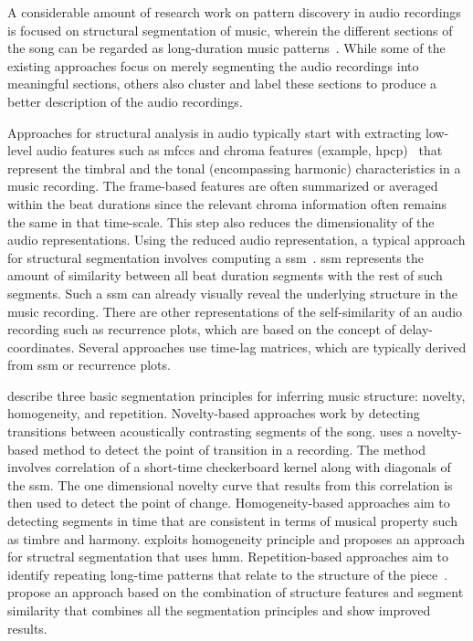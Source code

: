 A considerable amount of research work on pattern discovery in audio recordings is focused on structural segmentation of music, wherein the different sections of the song can be regarded as long-duration music patterns~\citep{paulus2010state}. While some of the existing approaches focus on merely segmenting the audio recordings into meaningful sections, others also cluster and label these sections to produce a better description of the audio recordings. 

Approaches for structural analysis in audio typically start with extracting low-level audio features such as \gls{mfccs} and chroma features (example, \gls{hpcp})~\citep{gomez2006tonal} that represent the timbral and the tonal (encompassing harmonic) characteristics in a music recording. The frame-based features are often summarized or averaged within the beat durations since the relevant chroma information often remains the same in that time-scale. This step also reduces the dimensionality of the audio representations. Using the reduced audio representation, a typical approach for structural segmentation involves computing a \gls{ssm}~\citep{foote2000automatic}. \Gls{ssm} represents the amount of similarity between all beat duration segments with the rest of such segments. Such a \gls{ssm} can already visually reveal the underlying structure in the music recording. There are other representations of the self-similarity of an audio recording such as recurrence plots, which are based on the concept of delay-coordinates. Several approaches use time-lag matrices, which are typically derived from \gls{ssm} or recurrence plots.

\cite{paulus2010state} describe three basic segmentation principles for inferring music structure: novelty, homogeneity, and repetition. Novelty-based approaches work by detecting transitions between acoustically contrasting segments of the song. \cite{foote2000automatic} uses a novelty-based method to detect the point of transition in a recording. The method involves correlation of a short-time checkerboard kernel along with diagonals of the \gls{ssm}. The one dimensional novelty curve that results from this correlation is then used to detect the point of change. Homogeneity-based approaches aim to detecting segments in time that are consistent in terms of musical property such as timbre and harmony. \cite{Levy08TASLP} exploits homogeneity principle and proposes an approach for structral segmentation that uses \acrfull{hmm}. Repetition-based approaches aim to identify repeating long-time patterns that relate to the structure of the piece~\cite{Goto06TASLP,dannenberg2003pattern,muller2006towards}.  \cite{serra2014unsupervised} propose an approach based on the combination of structure features and segment similarity that combines all the segmentation principles and show improved results.  

